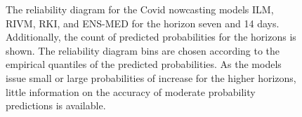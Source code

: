 \documentclass[pdflatex]{sn-jnl}
\theoremstyle{plain}%
\theoremstyle{definition}
\begin{document}
\begin{figure}
\begin{subfigure}{\textwidth}
    \end{subfigure}
    \caption[Reliability diagrams for Covid nowcasting models and the horizon seven and 14 days.]{The reliability diagram for the Covid nowcasting models ILM, RIVM, RKI, and ENS-MED for the horizon seven and 14 days.
    Additionally, the count of predicted probabilities for the horizons is shown.
        The reliability diagram bins are chosen according to the empirical quantiles of the predicted probabilities.
    As the models issue small or large probabilities of increase for the higher horizons, little information on the accuracy of moderate probability predictions is available.}
    \label{fig:app-covid-rel}
\end{figure}
\end{document}
